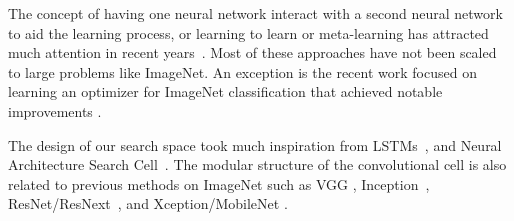 \documentclass[10pt,twocolumn,letterpaper]{article}
\begin{document}
The concept of having one neural network interact with a second neural network to aid the learning process, or learning to learn or meta-learning \cite{hochreiter2001learning,schaul10} has attracted much attention in recent years~\cite{andrychowicz2016learning,wang2016learning,duan2016rl,ha2016hypernetworks,li2017learning,ravi2017optimization,finn2017model}. Most of these approaches have not been scaled to large problems like ImageNet. An exception is the recent work focused on learning an optimizer for ImageNet classification that achieved notable improvements \cite{wichrowska2017learned}.

The design of our search space took much inspiration from LSTMs~\cite{lstm}, and Neural Architecture Search Cell~\cite{zoph2017neural}. The modular structure of the convolutional cell is also related to previous methods on ImageNet such as VGG \cite{simonyan2014very}, Inception~\cite{szegedy2015going,szegedy2016rethinking,szegedy2016inception}, ResNet/ResNext~\cite{he2015deep,xie2016aggregated}, and Xception/MobileNet \cite{chollet2016xception, howard2017mobilenets}.
\end{document}
